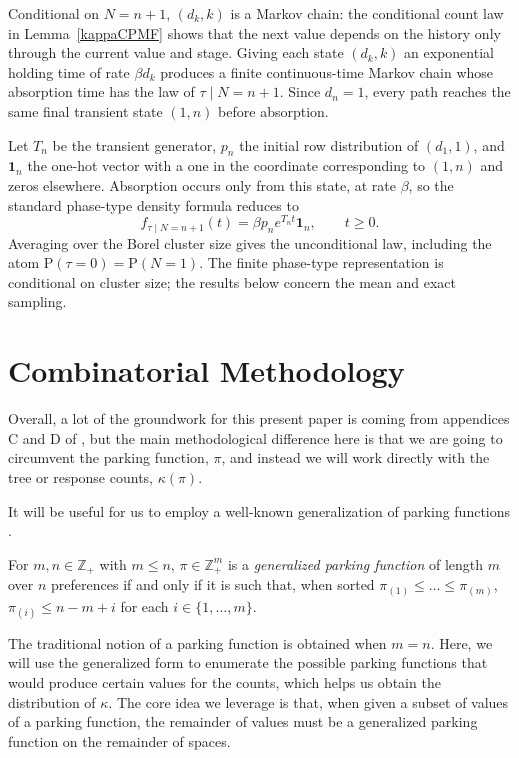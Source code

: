 \documentclass[stsy,dblanonrev]{amers/INFORMS-STSY-Template-26-02-2026/informs4}
\newcommand{\PP}[1]{\mathrm{P}\left(#1\right)}
\begin{document}
Conditional on $N=n+1$, $(d_k,k)$ is a Markov chain: the conditional count law in Lemma~\ref{kappaCPMF} shows that the next value depends on the history only through the current value and stage. Giving each state $(d_k,k)$ an exponential holding time of rate $\beta d_k$ produces a finite continuous-time Markov chain whose absorption time has the law of $\tau\mid N=n+1$. Since $d_n=1$, every path reaches the same final transient state $(1,n)$ before absorption.

Let $T_n$ be the transient generator, $p_n$ the initial row distribution of $(d_1,1)$, and $\mathbf{1}_n$ the one-hot vector with a one in the coordinate corresponding to $(1,n)$ and zeros elsewhere. Absorption occurs only from this state, at rate $\beta$, so the standard phase-type density formula \citep{latouche1999introduction} reduces to
\begin{equation}
f_{\tau\mid N=n+1}(t)=\beta p_n e^{T_nt}\mathbf{1}_n,\qquad t\geq0.
\end{equation}
Averaging over the Borel cluster size gives the unconditional law, including the atom $\PP{\tau=0}=\PP{N=1}$. The finite phase-type representation is conditional on cluster size; the results below concern the mean and exact sampling.

\section{Combinatorial Methodology}\label{sec:combinatorics}
Overall, a lot of the groundwork for this present paper is coming from appendices C and D of \citet{daw2024asymmetries}, but the main methodological difference here is that we are going to circumvent the parking function, $\pi$, and instead we will work directly with the tree or response counts, $\kappa(\pi)$.

It will be useful for us to employ a well-known generalization of parking functions \citep[see, e.g.,][]{stanley2002polytope,yan2015parking,kenyon2023parking}. 

\begin{definition}\label{gpfDef}
For $m, n \in \mathbb{Z}_+$ with $m \leq n$, $\pi \in \mathbb{Z}_+^m$ is a \emph{generalized parking function} of length $m$ over $n$ preferences if and only if it is such that, when sorted $\pi_{(1)} \leq \dots \leq \pi_{(m)}$, $\pi_{(i)} \leq n - m + i$ for each $i \in \{1, \dots, m\}$.\hfill \Halmos 
\end{definition}

The traditional notion of a parking function is obtained when $m = n$. Here, we will use the generalized form to enumerate the possible parking functions that would produce certain values for the counts, which helps us obtain the distribution of $\kappa$. The core idea we leverage is that, when given a subset of values of a parking function, the remainder of values must be a generalized parking function on the remainder of spaces.
\end{document}
